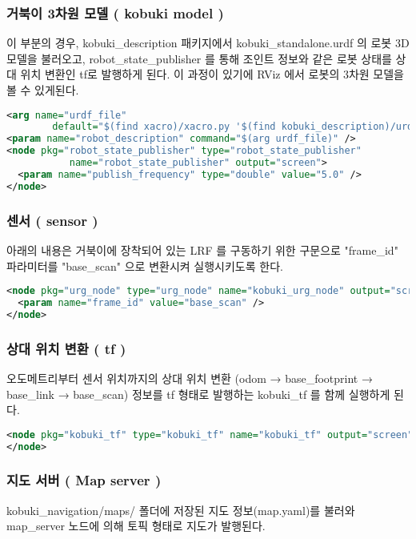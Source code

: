 \subsubsection{거북이 3차원 모델 ( kobuki model )}
이 부분의 경우, kobuki\_description 패키지에서 kobuki\_standalone.urdf 의 로봇 3D 모델을 불러오고, robot\_state\_publisher 를 통해 조인트 정보와 같은 로봇 상태를 상대 위치 변환인 tf로 발행하게 된다. 이 과정이 있기에 RViz 에서 로봇의 3차원 모델을 볼 수 있게된다.

\vspace{\baselineskip}
\begin{lstlisting}[language=XML]
<arg name="urdf_file" 
        default="$(find xacro)/xacro.py '$(find kobuki_description)/urdf/kobuki_standalone.urdf.xacro'" />
<param name="robot_description" command="$(arg urdf_file)" />
<node pkg="robot_state_publisher" type="robot_state_publisher" 
           name="robot_state_publisher" output="screen">
  <param name="publish_frequency" type="double" value="5.0" />
</node>
\end{lstlisting}

\subsubsection{센서 ( sensor )}
아래의 내용은 거북이에 장착되어 있는 LRF 를 구동하기 위한 구문으로 "frame\_id" 파라미터를 "base\_scan" 으로 변환시켜 실행시키도록 한다.

\vspace{\baselineskip}
\begin{lstlisting}[language=XML]
<node pkg="urg_node" type="urg_node" name="kobuki_urg_node" output="screen">
  <param name="frame_id" value="base_scan" />
</node>
\end{lstlisting}

\subsubsection{상대 위치 변환 ( tf )}
오도메트리부터 센서 위치까지의 상대 위치 변환 (odom → base\_footprint → base\_link → base\_scan) 정보를 tf 형태로 발행하는 kobuki\_tf 를 함께 실행하게 된다.

\vspace{\baselineskip}
\begin{lstlisting}[language=XML]
<node pkg="kobuki_tf" type="kobuki_tf" name="kobuki_tf" output="screen">
</node>
\end{lstlisting}

\subsubsection{지도 서버 ( Map server )}
kobuki\_navigation/maps/ 폴더에 저장된 지도 정보(map.yaml)를 불러와 map\_server 노드에 의해 토픽 형태로 지도가 발행된다.

